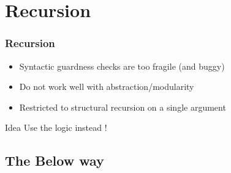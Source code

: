   

\section{Recursion}

\begin{frame}
  \frametitle{Recursion}
  
  \begin{itemize}
  \item Syntactic guardness checks are too fragile (and buggy)
  \item Do not work well with abstraction/modularity
  \item Restricted to structural recursion on a single argument
  \end{itemize}

  \alert{Idea} Use the logic instead !

\end{frame}

\subsection{The Below way}

